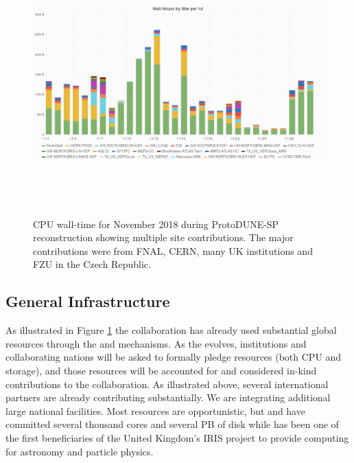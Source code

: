 \begin{figure}[htp]
\centering
\includegraphics[height=4in]{graphics/comp-vo-summary.png}

\caption{CPU wall-time for November 2018 during ProtoDUNE-SP reconstruction showing multiple site contributions.  The major contributions were from FNAL, CERN, many UK institutions and FZU in the Czech Republic.}
\label{fig:ch-exec-comp-cpupie}
\end{figure}


\subsection{General Infrastructure}
As illustrated in Figure \ref{fig:ch-exec-comp-cpupie} the collaboration has already used substantial global resources through the  and  mechanisms. As the  evolves, institutions and collaborating nations will be asked to formally pledge resources (both CPU and storage), and those resources will be accounted for and considered in-kind contributions to the collaboration.
As illustrated above, several international partners are already contributing substantially. We are integrating additional large national facilities. Most resources are opportunistic, but  and  have committed several thousand cores and several PB of disk while  has been one of the first beneficiaries of the United Kingdom's IRIS project to provide computing for astronomy and particle physics.


